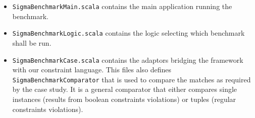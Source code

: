\begin{itemize}[---]
  \item \texttt{SigmaBenchmarkMain.scala} contains the main application running the benchmark.
  \item \texttt{SigmaBenchmarkLogic.scala} contains the logic selecting which benchmark shall be run.
  \item \texttt{SigmaBenchmarkCase.scala} contains the adaptors bridging the framework with our constraint language. 
  This files also defines \texttt{SigmaBenchmarkComparator} that is used to compare the matches as required by the case study.
  It is a general comparator that either compares single instances (results from boolean constraints violations) or tuples (regular constraints violations).
\end{itemize}